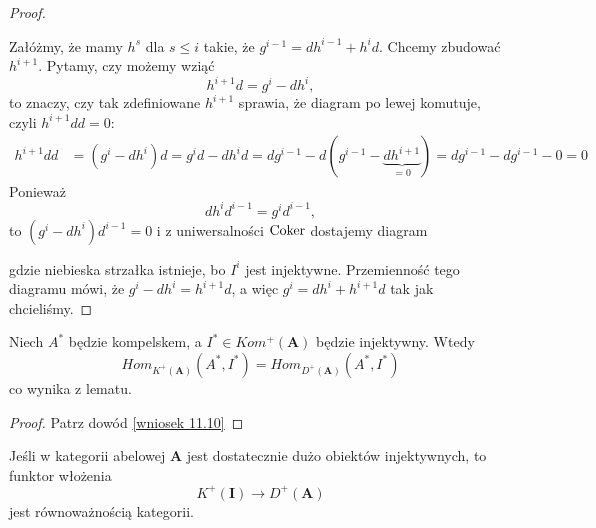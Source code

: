 \begin{proof}
  \begin{center}\end{center}
  Załóżmy, że mamy $h^s$ dla $s\leq i$ takie, że $g^{i-1}=dh^{i-1}+h^id$. Chcemy zbudować $h^{i+1}$.
  Pytamy, czy możemy wziąć
  $$h^{i+1}d=g^i-dh^i,$$
  to znaczy, czy tak zdefiniowane $h^{i+1}$ sprawia, że diagram po lewej komutuje, czyli $h^{i+1}dd=0$:
  \begin{align*}
    h^{i+1}dd&=(g^i-dh^i)d=g^id-dh^id=dg^{i-1}-d(g^{i-1}-\underbrace{dh^{i+1}}_{=0})=dg^{i-1}-dg^{i-1}-0=0
  \end{align*}
  Ponieważ
  $$dh^id^{i-1}=g^id^{i-1},$$
  to $(g^i-dh^i)d^{i-1}=0$ i z uniwersalności $\operatorname{Coker}$ dostajemy diagram
  \begin{center}\end{center}
  gdzie niebieska strzałka istnieje, bo $I^i$ jest injektywne. Przemienność tego diagramu mówi, że $g^i-dh^i=h^{i+1}d$, a więc $g^i=dh^i+h^{i+1}d$ tak jak chcieliśmy.
\end{proof}

\begin{conclusion}\label{wniosek 12.2}
  Niech $A^*$ będzie kompelskem, a $I^*\in Kom^+(\mathbf{A})$ będzie injektywny. Wtedy 
  $$Hom_{K^+(\mathbf{A})}(A^*, I^*)=Hom_{D^+(\mathbf{A})}(A^*, I^*)$$
  co wynika z lematu.
\end{conclusion}

\begin{proof}Patrz dowód \ref{wniosek 11.10}
\end{proof}

\begin{theorem}
  Jeśli w kategorii abelowej $\mathbf{A}$ jest dostatecznie dużo obiektów injektywnych, to funktor włożenia
  $$K^+(\mathbf{I})\to D^+(\mathbf{A})$$
  jest równoważnością kategorii.
\end{theorem}

